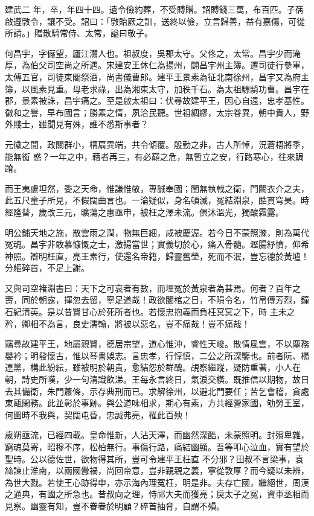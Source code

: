 \begin{pinyinscope}
 建武二
 年，卒，年四十四。遺令儉約葬，不受賻贈。詔賻錢三萬，布百匹。子蒨啟遵斆令，讓不受。詔曰：「斆貽厥之訓，送終以儉，立言歸善，益有嘉傷，可從所請。」贈散騎常侍、太常，謚曰敬子。



 何昌宇，字儼望，廬江灊人也。祖叔度，吳郡太守。父佟之，太常。昌宇少而淹厚，為伯父司空尚之所遇。宋建安王休仁為揚州，闢昌宇州主簿。遷司徒行參軍，太傅五官，司徒東閣祭酒，尚書儀曹郎。建平王景素為征北南徐州，昌宇又為府主簿，以風素見重。母老求祿，出為湘東太守，加秩千石。為太祖驃騎功曹。昌宇在郡，景素被誅，昌宇痛之。至是啟太祖曰：伏尋故建平王，因心自遠，忠孝基性。徽和之譽，早布國言；勝素之情，夙洽民聽。世祖綢繆，太宗眷異，朝中貴人，野外賤士，雖聞見有殊，誰不悉斯事者？



 元徽之間，政關群小，構扇異端，共令傾覆。殷勤之非，古人所悼，況蒼梧將季，能無衒
 惑？一年之中，藉者再三，有必巔之危，無暫立之安，行路寒心，往來跼蹐。



 而王夷慮坦然，委之天命，惟謙惟敬，專誠奉國；閨無執戟之衛，門闕衣介之夫，此五尺童子所見，不假闊曲言也。一淪疑似，身名頓滅，冤結淵泉，酷貫穹昊。時經隆替，歲改三元，曠蕩之惠亟申，被枉之澤未流。俱沐溫光，獨酸霜露。



 明公鋪天地之施，散雲雨之潤，物無巨細，咸被慶渥。若今日不蒙照滌，則為萬代冤魂。昌宇非敢慕慷慨之士，激揚當世；實義切於心，痛入骨髓。瀝腸紓憤，仰希神照。辯明枉直，亮王素行，使還名帝籍，歸靈舊塋，死而不泯，豈忘德於黃壚！分軀碎首，不足上謝。



 又與司空褚淵書曰：天下之可哀者有數，而埋冤於黃泉者為甚焉。何者？百年之壽，同於朝露，揮忽去留，寧足道哉！政欲闔棺之日，不隕令名，竹帛傳芳烈，鐘石紀清英。是以昔賢甘心於死所者也。若懷忠抱義而負枉冥冥之下，時
 主未之矜，卿相不為言，良史濡翰，將被以惡名，豈不痛哉！豈不痛哉！



 竊尋故建平王，地屬親賢，德居宗望，道心惟沖，睿性天峻。散情風雲，不以塵務嬰衿；明發懷古，惟以琴書娛志。言忠孝，行惇慎，二公之所深鑒也。前者阮、楊連黨，構此紛紜，雖被明於朝貴，愈結怨於群醜。覘察繼蹤，疑防重著，小人在朝，詩史所嘆，少一句清識飲涕。王每永言終日，氣淚交橫。既推信以期物，故日去其備衛，朱門蕭條，示存典刑而已。求解徐州，以避北門要任；苦乞會稽，貪處東甌閑務。此並彰於事跡。與公道味相求，期心有素，方共經營家國，劬勞王室，何圖時不我與，契闊屯昏，忠誠弗亮，罹此百殃！



 歲朔亟流，已經四載。皇命惟新，人沾天澤，而幽然深酷，未蒙照明。封殯卑雜，窮魂莫寄，昭穆不序，松柏無行。事傷行路，痛結幽顯。吾等叩心泣血，實有望於聖時。公以德佐世，欲物得其所，豈可令建平王枉直
 不分邪？田叔不言梁事，袁絲諫止淮南，以兩國釁禍，尚回帝意，豈非親親之義，寧從敦厚？而今疑以未辨，為世大戮。若使王心跡得申，亦示海內理冤枉，明是非。夫存亡國，繼絕世，周漢之通典，有國之所急也。昔叔向之理，恃祁大夫而獲亮；戾太子之冤，資車丞相而見察。幽靈有知，豈不眷眷於明顧？碎首抽脅，自謂不殞。




\end{pinyinscope}
